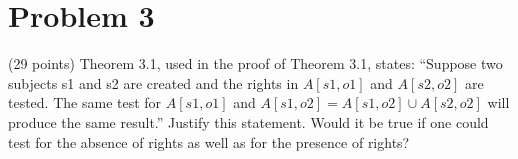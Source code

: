 \section*{Problem 3}

(29 points) Theorem 3.1, used in the proof of Theorem 3.1, states: 
``Suppose two subjects s1 and s2 are created and the rights in $A[s1, o1]$ and $A[s2, o2]$ are tested. The same test for $A[s1, o1]$ and $A[s1, o2] = A[s1, o2] \cup A[s2, o2]$ will produce the same result.''
Justify this statement. 
Would it be true if one could test for the absence of rights as well as for the presence of rights?